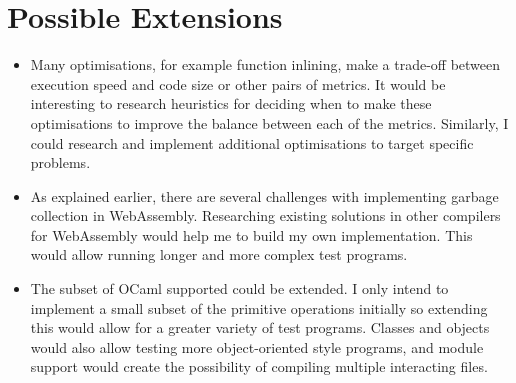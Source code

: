 \documentclass[12pt]{article}
\begin{document}
\section*{Possible Extensions}
\begin{itemize}

\item Many optimisations, for example function inlining, make a trade-off between execution speed and code size or other pairs of metrics. It would be interesting to research heuristics for deciding when to make these optimisations to improve the balance between each of the metrics. Similarly, I could research and implement additional optimisations to target specific problems.

\item As explained earlier, there are several challenges with implementing garbage collection in WebAssembly. Researching existing solutions in other compilers for WebAssembly would help me to build my own implementation. This would allow running longer and more complex test programs.



\item The subset of OCaml supported could be extended. I only intend to implement a small subset of the primitive operations initially so extending this would allow for a greater variety of test programs. Classes and objects would also allow testing more object-oriented style programs, and module support would create the possibility of compiling multiple interacting files.


\end{itemize}
\end{document}
